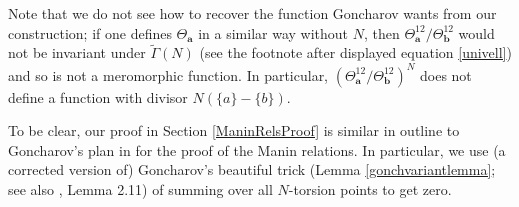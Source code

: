 \documentclass[12pt,amstex,amssymb]{article}
\theoremstyle{plain}
\theoremstyle{definition}
\def\cD{{\cal D}}
\def\cE{{\cal E}}
\newcommand{\ba}{\mathbf{a}}
\newcommand{\bb}{\mathbf{b}}
\begin{document}


Note that we do not see how to recover the function Goncharov wants from our construction; if one defines $\Theta_{\ba}$ in a similar way without $N$,
	 then $\Theta_{\ba}^{12}/\Theta_{\bb}^{12}$ would not be invariant under $\tilde \Gamma(N)$ (see the footnote after displayed equation \eqref{univell})  and so is not a meromorphic function.  In particular, $(\Theta_{\ba}^{12}/\Theta_{\bb}^{12})^N$ does not define a function with divisor $N (\{a\} - \{b\})$.%


To be clear, our proof in Section \ref{ManinRelsProof} is similar in outline to Goncharov's plan in \cite{Gon} for the proof of the Manin relations.  In particular, we use (a corrected version of) Goncharov's beautiful trick (Lemma \ref{gonchvariantlemma}; see also \cite{Gon}, Lemma 2.11) of summing over all $N$-torsion points to get zero.
\end{document}
